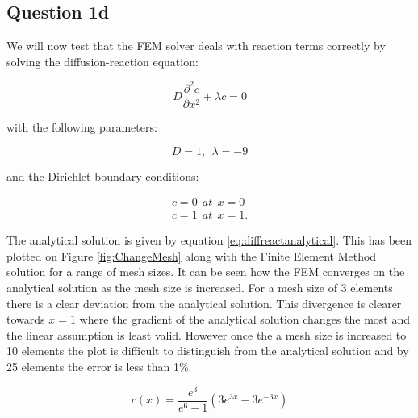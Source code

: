 \documentclass[11pt]{article}
\begin{document}
\subsection{Question 1d}

We will now test that the FEM solver deals with reaction terms correctly by solving the diffusion-reaction equation:

\begin{equation*}
D \frac{\partial^2 c}{\partial x^2} + \lambda c = 0
\end{equation*}

with the following parameters:

\begin{equation*}
D = 1, \ \  \lambda = -9
\end{equation*}

and the Dirichlet boundary conditions:


\begin{align*}
c = 0 \ \ at \ \ x = 0 \\
c = 1 \ \ at \ \  x= 1  .
\end{align*}


The analytical solution is given by equation \ref{eq:diffreactanalytical}. This has been plotted on Figure \ref{fig:ChangeMesh} along with the Finite Element Method solution for a range of mesh sizes. It can be seen how the FEM converges on the analytical solution as the mesh size is increased. For a mesh size of 3 elements there is a clear deviation from the analytical solution. This divergence is clearer towards $x = 1$ where the gradient of the analytical solution changes the most and the linear assumption is least valid. However once the a mesh size is increased to 10 elements the plot is difficult to distinguish from the analytical solution and by 25 elements the error is less than 1\%.

\begin{equation}\label{eq:diffreactanalytical}
c(x) = \frac{e^3 }{e^6 - 1} (3e^{3x} - 3e^{-3x})
\end{equation}
\end{document}
